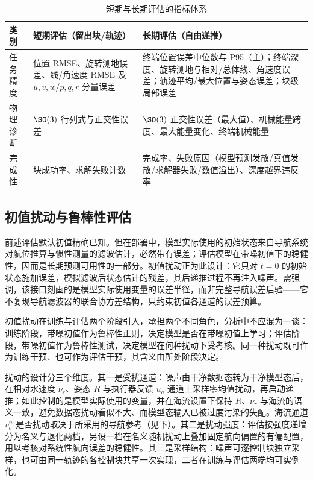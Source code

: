 \begin{table}[htbp]
  \centering
  \caption{短期与长期评估的指标体系}
  \label{tab:metrics}
  \begin{tabularx}{\textwidth}{>{\raggedright\arraybackslash}p{}>{\raggedright\arraybackslash}X>{\raggedright\arraybackslash}X}
    \toprule
    类别 & 短期评估（留出块/轨迹） & 长期评估（自由递推） \\
    \midrule
    任务精度 & 位置 RMSE、旋转测地误差、线/角速度 RMSE 及 \(u,v,w\)/\(p,q,r\) 分量误差 & 终端位置误差中位数与 P95（主）；终端深度、旋转测地与相对/总体线、角速度误差；轨迹平均/最大位置与姿态误差；块级局部误差 \\
    物理诊断 & \(\SO(3)\) 行列式与正交性误差 & \(\SO(3)\) 正交性误差（最大值）、机械能量跨度、最大能量变化、终端机械能量 \\
    完成性 & 块成功率、求解失败计数 & 完成率、失败原因（模型预测发散/真值发散/求解器失败/数值溢出）、深度越界违反率 \\
    \bottomrule
  \end{tabularx}
\end{table}

\subsection{初值扰动与鲁棒性评估}
\label{subsec:ic-perturbation}

前述评估默认初值精确已知。但在部署中，模型实际使用的初始状态来自导航系统对航位推算与惯性测量的滤波估计，必然带有误差；评估模型在带噪初值下的稳健性，因而是长期预测可用性的一部分。初值扰动正为此设计：它只对 \(t=0\) 的初始状态施加误差，模拟滤波后状态估计的残差，其后递推过程不再注入噪声。需强调，该接口刻画的是模型实际使用变量的误差半径，而非完整导航误差后验——它不复现导航滤波器的联合协方差结构，只约束初值各通道的误差预算。

初值扰动在训练与评估两个阶段引入，承担两个不同角色，分析中不应混为一谈：训练阶段，带噪初值作为鲁棒性正则，决定模型是否在带噪初值上学习；评估阶段，带噪初值作为鲁棒性测试，决定模型在何种扰动下受考核。同一种扰动既可作为训练干预、也可作为评估干预，其含义由所处阶段决定。

扰动的设计分三个维度。其一是受扰通道：噪声由干净数据态转为干净模型态后，在相对水速度 \(\nu_r\)、姿态 \(R\) 与执行器反馈 \(u_a\) 通道上采样零均值扰动，再启动递推；如此控制的是模型实际使用的变量，并在海流设置下保持 \(R\)、\(\nu_r\) 与海流的语义一致，避免数据态扰动看似不大、而模型态输入已被过度污染的失配。海流通道 \(v_c^n\) 是否扰动取决于所采用的导航参考（见下）。其二是扰动强度：评估按强度递增分为名义与退化两档，另设一档在名义随机扰动上叠加固定航向偏置的有偏配置，用以考核对系统性航向误差的稳健性。其三是采样结构：噪声可逐控制块独立采样，也可由同一轨迹的各控制块共享一次实现，二者在训练与评估两端均可实例化。

